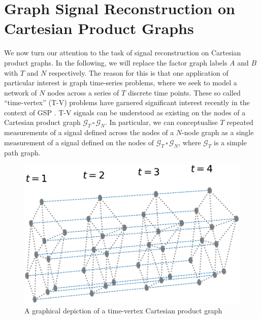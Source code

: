 \section{Graph Signal Reconstruction on Cartesian Product Graphs}

\label{sec:gsr_cpg}

We now turn our attention to the task of signal reconstruction on Cartesian product graphs. In the following, we will replace the factor graph labels $A$ and $B$ with $T$ and $N$ respectively. The reason for this is that one application of particular interest is graph time-series problems, where we seek to model a network of $N$ nodes across a series of $T$ discrete time points. These so called ``time-vertex'' (T-V) problems have garnered significant interest recently in the context of GSP \citep{Grassi2018, Isufi2017, Loukas2016}. T-V signals can be understood as existing on the nodes of a Cartesian product graph $\mathcal{G}_T \, \square \, \mathcal{G}_N$. In particular, we can conceptualise $T$ repeated measurements of a signal defined across the nodes of a $N$-node graph as a single measurement of a signal defined on the nodes of $\mathcal{G}_T \, \square \, \mathcal{G}_N$, where $\mathcal{G}_T$ is a simple path graph.

\vspace{1cm}


\begin{figure}[t]
    \begin{center}
        \includegraphics[width=0.5\linewidth]{Figures/T-V.pdf}
    \end{center}
    \caption[A time-vertex Cartesian product graph]{A graphical depiction of a time-vertex Cartesian product graph}
    \label{fig:TV}
\end{figure}



